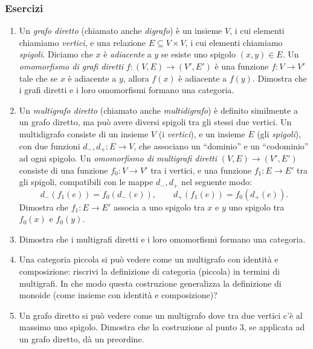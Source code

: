 \subsubsection*{Esercizi}
\begin{enumerate}
	\item Un \emph{grafo diretto} (chiamato anche \emph{digrafo}) è un insieme \(V\), i cui elementi chiamiamo \emph{vertici}, e una relazione \(E\subseteq V\times V\), i cui elementi chiamiamo \emph{spigoli}. Diciamo che \(x\) è \emph{adiacente} a \(y\) se esiste uno spigolo \((x,y)\in E\). Un \emph{omomorfismo di grafi diretti} \(f:(V,E)\to (V',E')\) è una funzione \(f:V\to V'\) tale che se \(x\) è adiacente a \(y\), allora \(f(x)\) è adiacente a \(f(y)\). Dimostra che i grafi diretti e i loro omomorfismi formano una categoria.
	\item Un \emph{multigrafo diretto} (chiamato anche \emph{multidigrafo}) è definito similmente a un grafo diretto, ma può avere diversi spigoli tra gli stessi due vertici. Un multidigrafo consiste di un insieme \(V\) (i \emph{vertici}), e un insieme \(E\) (gli \emph{spigoli}), con due funzioni \(d_-,d_+:E\to V\), che associano un ``dominio'' e un ``codominio'' ad ogni spigolo. Un \emph{omomorfismo di multigrafi diretti} \((V,E)\to (V',E')\) consiste di una funzione \(f_0:V\to V'\) tra i vertici, e una funzione \(f_1:E\to E'\) tra gli spigoli, compatibili con le mappe \(d_-,d_+\) nel seguente modo:
	      \[
		      d_-(f_1(e)) = f_0(d_-(e)) ,\qquad d_+(f_1(e)) = f_0(d_+(e)) .
	      \]
	      Dimostra che \(f_1:E\to E'\) associa a uno spigolo tra \(x\) e \(y\) uno spigolo tra \(f_0(x)\) e \(f_0(y)\).
	\item Dimostra che i multigrafi diretti e i loro omomorfismi formano una categoria.
	\item Una categoria piccola si può vedere come un multigrafo con identità e composizione: riscrivi la definizione di categoria (piccola) in termini di multigrafi.  In che modo questa costruzione generalizza la definizione di monoide (come insieme con identità e composizione)?
	\item Un grafo diretto si può vedere come un multigrafo dove tra due vertici c'è al massimo uno spigolo. Dimostra che la costruzione al punto 3, se applicata ad un grafo diretto, dà un preordine.
\end{enumerate}
\color{black}
